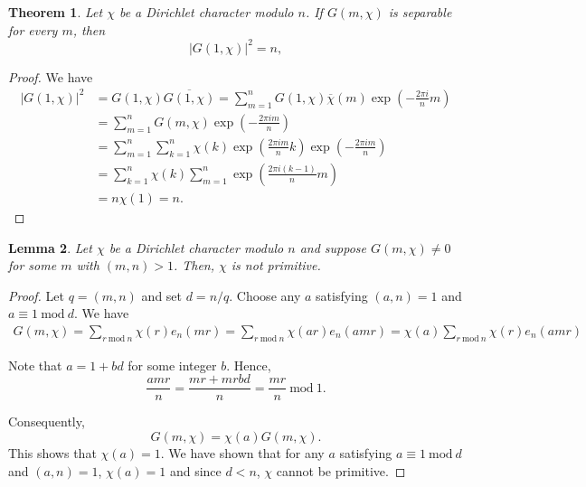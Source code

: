 \documentclass[12pt]{article}
\theoremstyle{thmstyle}
\newtheorem{theorem}{Theorem}[section]
\newtheorem{lemma}[theorem]{Lemma}
\theoremstyle{defstyle}
\renewcommand{\mod}{~\mathrm{mod}~}
\begin{document}
\begin{theorem}
    Let $\chi$ be a Dirichlet character modulo $n$. If $G(m,\chi)$ is separable for every $m$, then 
    \begin{equation*}
        |G(1,\chi)|^2 = n,
    \end{equation*}
\end{theorem}
\begin{proof}
    We have 
    \begin{align*}
        |G(1,\chi)|^2 &= G(1,\chi)\overline{G(1,\chi)} = \sum_{m = 1}^n G(1,\chi)\overline\chi(m)\exp\left(-\frac{2\pi i}{n}m\right)\\
        &= \sum_{m = 1}^n G(m,\chi)\exp\left(-\frac{2\pi i m}{n}\right)\\
        &= \sum_{m = 1}^n \sum_{k = 1}^n \chi(k)\exp\left(\frac{2\pi i m}{n}k\right)\exp\left(-\frac{2\pi i m}{n}\right)\\
        &= \sum_{k = 1}^n\chi(k)\sum_{m = 1}^n \exp\left(\frac{2\pi i (k - 1)}{n}m\right)\\
        &= n\chi(1) = n. 
    \end{align*}
\end{proof}

\begin{lemma}
    Let $\chi$ be a Dirichlet character modulo $n$ and suppose $G(m,\chi)\ne 0$ for some $m$ with $(m,n) > 1$. Then, $\chi$ is not primitive.
\end{lemma}
\begin{proof}
    Let $q = (m,n)$ and set $d = n/q$. Choose any $a$ satisfying $(a,n) = 1$ and $a\equiv 1\mod d$. We have 
    \begin{align*}
        G(m,\chi) = \sum_{r\mod n}\chi(r)e_n(mr) = \sum_{r\mod n}\chi(ar)e_n(amr) = \chi(a)\sum_{r\mod n}\chi(r)e_n(amr)
    \end{align*}

    Note that $a = 1 + bd$ for some integer $b$. Hence, 
    \begin{equation*}
        \frac{amr}{n} = \frac{mr + mrbd}{n} = \frac{mr}{n}\mod 1.
    \end{equation*}
    
    Consequently, 
    \begin{equation*}
        G(m,\chi) = \chi(a)G(m,\chi).
    \end{equation*}
    This shows that $\chi(a) = 1$. We have shown that for any $a$ satisfying $a\equiv 1\mod d$ and $(a,n) = 1$, $\chi(a) = 1$ and since $d < n$, $\chi$ cannot be primitive.
\end{proof}
\end{document}
